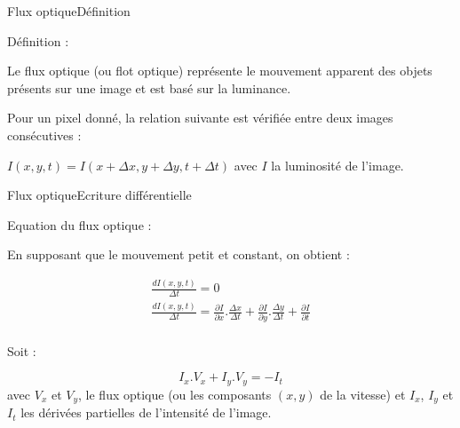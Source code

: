 \begin{frame}{Flux optique}{Définition}

\begin{block}{Définition :}

Le flux optique (ou flot optique) représente le mouvement apparent des objets présents sur une image et est basé sur la luminance.

Pour un pixel donné, la relation suivante est vérifiée entre deux images consécutives :

$I(x, y, t) = I(x + \Delta x, y + \Delta y, t + \Delta t)$ avec $I$ la luminosité de l'image.

\end{block}

\end{frame}

\begin{frame}{Flux optique}{Ecriture différentielle}

\begin{block}{Equation du flux optique :}

En supposant que le mouvement petit et constant, on obtient :

\[	
	\begin{array}{c}
	     \frac{dI(x, y, t)}{\Delta t} = 0 \\
	     \frac{dI(x, y, t)}{\Delta t} = \frac{\partial I}{\partial x}.\frac{\Delta x}{\Delta t} + \frac{\partial I}{\partial y}.\frac{\Delta y}{\Delta t} + \frac{\partial I}{\partial t}\\
	\end{array}
\]

Soit :

\[
	I_x.V_x + I_y.V_y = -I_t
\]
avec $V_x$ et $V_y$, le flux optique (ou les composants $(x, y)$ de la vitesse) et $I_x$, $I_y$ et $I_t$ les dérivées partielles de l'intensité de l'image.

\end{block}

\end{frame}

